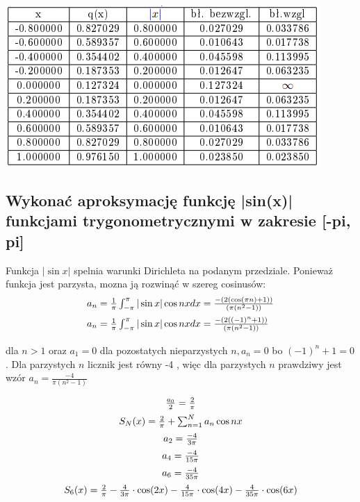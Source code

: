 \documentclass[5]{article}
\begin{document}
\vspace{5mm}

\hfil
\includegraphics[scale=0.8]{tab11.PNG} \par
\vspace{3mm}


\vspace{5mm}

\subsection{Wykonać aproksymację funkcję  |sin(x)|  funkcjami trygonometrycznymi w zakresie [-pi, pi]}

Funkcja $|\sin x|$ spelnia warunki Dirichleta na podanym przedziale. Ponieważ funkcja jest parzysta, mozna ją rozwinąć w szereg cosinusów:
$$
\begin{array}{l}
\vspace{2mm}
a_{n}=\frac{1}{\pi} \int_{-\pi}^{\pi}|\sin x| \cos n x d x=\frac{-(2(\cos (\pi n)+1))}{\left(\pi\left(n^{2}-1\right)\right)} \\
\vspace{2mm}
a_{n}=\frac{1}{\pi} \int_{-\pi}^{\pi}|\sin x| \cos n x d x=\frac{-\left(2\left((-1)^{n}+1\right)\right)}{\left(\pi\left(n^{2}-1\right)\right)}
\end{array}
$$
dla $n>1$ oraz $a_{1}=0$ dla pozostatych nieparzystych $n, a_{n}=0$ bo $(-1)^{n}+1=0$. Dla parzystych $n$ licznik jest równy -4 , więc dla parzystych $n$ prawdziwy jest wzór $a_{n}=\frac{-4}{\pi\left(n^{2}-1\right)}$


$$
\begin{array}{c}
\vspace{2mm}
\frac{a_{0}}{2}=\frac{2}{\pi} \\
\vspace{2mm}
S_{N}(x)=\frac{2}{\pi}+\sum_{n=1}^{N} a_{n} \cos n x \\
\vspace{2mm}
a_{2}=\frac{-4}{3 \pi} \\
\vspace{2mm}
a_{4}=\frac{-4}{15 \pi} \\
\vspace{2mm}
a_{6}=\frac{-4}{35 \pi} \\
\vspace{2mm}
S_{6}(x)=\frac{2}{\pi}-\frac{4}{3 \pi} \cdot \cos (2 x)-\frac{4}{15 \pi} \cdot \cos (4 x)-\frac{4}{35 \pi} \cdot \cos (6 x)
\end{array}
$$
\end{document}
